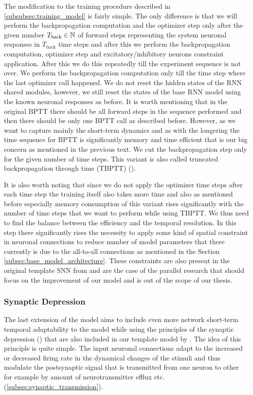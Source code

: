 The modification to the training procedure described in \ref{subsubsec:training_model} is fairly simple. The only difference is that we will perform the backpropagation computation and the optimizer step only after the given number $T_{\text{back}} \in \mathbb{N}$ of forward steps representing the system neuronal responses in $T_{\text{back}}$ time steps and after this we perform the backpropagation computation, optimizer step and excitatory/inhibitory neurons constraint application. After this we do this repeatedly till the experiment sequence is not over. We perform the backpropagation computation only till the time step where the last optimizer call happened. We do not reset the hidden states of the RNN shared modules, however, we still reset the states of the base RNN model using the known neuronal responses as before. It is worth mentioning that in the original BPTT there should be all forward steps in the sequence performed and then there should be only one BPTT call as described before. However, as we want to capture mainly the short-term dynamics and as with the longering the time sequence for BPTT is significantly memory and time efficient that is our big concern as mentioned in the previous text. We cut the backpropagation step only for the given number of time steps. This variant is also called truncated backpropagation through time (TBPTT) (\citet{Williams1990tbptt}).

It is also worth noting that since we do not apply the optimizer time steps after each time step the training itself also takes more time and also as mentioned before especially memory consumption of this variant rises significantly with the number of time steps that we want to perform while using TBPTT. We thus need to find the balance between the efficiency and the temporal resolution. In this step there significantly rises the necessity to apply some kind of spatial constraint in neuronal connections to reduce number of model parameters that there currently is due to the all-to-all connections as mentioned in the Section \ref{subsec:base_model_architecture}. These constraints are also present in the original template SNN from \citet{antolik2024comprehensive} and are the case of the parallel research that should focus on the improvement of our model and is out of the scope of our thesis.

\subsubsection{Synaptic Depression}
\label{subsubsec:synaptic_depression}
The last extension of the model aims to include even more network short-term temporal adaptability to the model while using the principles of the synaptic depression (\citet{abbott1997syndepression}) that are also included in our template model by \citet{antolik2024comprehensive}. The idea of this principle is quite simple. The input neuronal connections adapt to the increased or decreased firing rate in the dynamical changes of the stimuli and thus modulate the postsynaptic signal that is transmitted from one neuron to other for example by amount of neurotransmitter efflux etc. (\ref{subsec:synaptic_transmission}).

